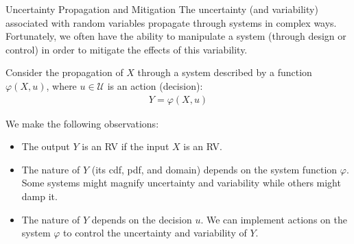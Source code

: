 \documentclass[9pt]{beamer}
\begin{document}
%
\begin{frame}{Uncertainty Propagation and Mitigation}
The uncertainty (and variability) associated with random variables propagate through systems in complex ways. Fortunately, we often have the ability to manipulate a system (through design or control) in order to mitigate the effects of this variability. 
\begin{block}{}
Consider the propagation of $X$ through a system described by a function $\varphi(X,u)$, where $u\in \mathcal{U}$ is an action (decision):
\begin{align*}
Y=\varphi(X,u)
\end{align*}
\end{block}
We make the following observations:
\begin{block}{}
\begin{itemize}
\item The output $Y$ is an RV if the input $X$ is an RV.
\item The nature of $Y$ (its cdf, pdf, and domain) depends on the system function $\varphi$. Some systems might magnify uncertainty and variability while others might damp it. 
\item The nature of $Y$ depends on the decision $u$.  We can implement actions on the system $\varphi$ to control the uncertainty and variability of $Y$.  
\end{itemize}
\end{block}
\end{frame}
\end{document}
